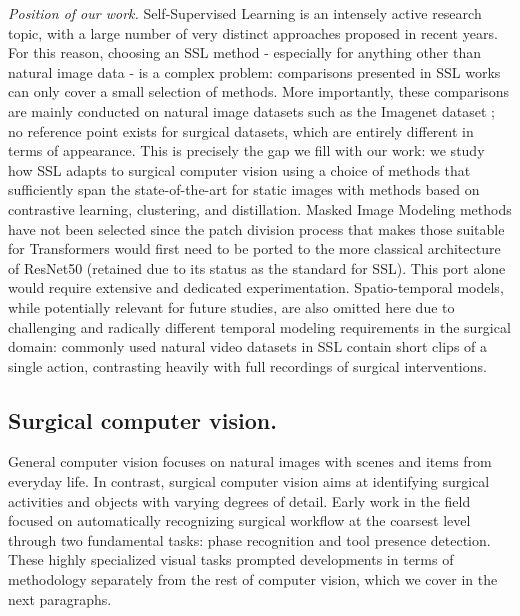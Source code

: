\documentclass[times,twocolumn,final]{elsarticle}
\begin{document}
\noindent\textit{Position of our work. }
Self-Supervised Learning is an intensely active research topic, with a large number of very distinct approaches proposed in recent years. For this reason, choosing an SSL method - especially for anything other than natural image data - is a complex problem: comparisons presented in SSL works can only cover a small selection of methods. More importantly, these comparisons are mainly conducted on natural image datasets such as the Imagenet dataset \cite{imagenet}; no reference point exists for surgical datasets, which are entirely different in terms of appearance. This is precisely the gap we fill with our work: we study how SSL adapts to surgical computer vision using a choice of methods that sufficiently span the state-of-the-art for static images {\color{newtext} with methods based on contrastive learning, clustering, and distillation. Masked Image Modeling methods have not been selected since the patch division process that makes those suitable for Transformers would first need to be ported to the more classical architecture of ResNet50 (retained due to its status as the standard for SSL). This port alone would require extensive and dedicated experimentation.} Spatio-temporal models, while potentially relevant for future studies, are {\color{newtext} also} omitted here due to challenging and radically different temporal modeling requirements in the surgical domain: commonly used natural video datasets in SSL \citep{kinetics, ucf, hmdb} contain short clips of a single action, contrasting heavily with full recordings of surgical interventions.

\subsection{Surgical computer vision. }
General computer vision focuses on natural images with scenes and items from everyday life. In contrast, surgical computer vision aims at identifying surgical activities and objects with varying degrees of detail. Early work in the field focused on automatically recognizing surgical workflow at the coarsest level through two fundamental tasks: phase recognition and tool presence detection. These highly specialized visual tasks prompted developments in terms of methodology separately from the rest of computer vision, which we cover in the next paragraphs.
\end{document}
